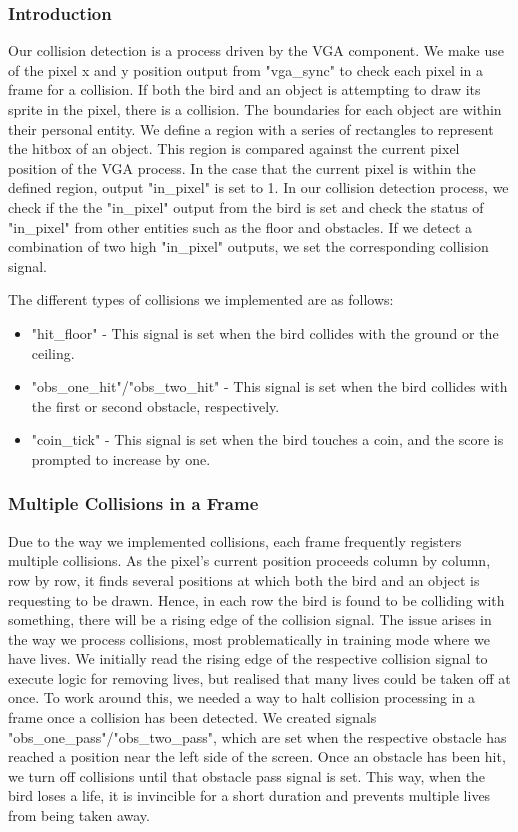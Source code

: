\documentclass[conference]{IEEEtran}
\begin{document}
\subsubsection{Introduction}
Our collision detection is a process driven by the VGA component. We make use of the pixel x and y position output from "vga\_sync" to check each pixel in a frame for a collision. If both the bird and an object is attempting to draw its sprite in the pixel, there is a collision. The boundaries for each object are within their personal entity. We define a region with a series of rectangles to represent the hitbox of an object. This region is compared against the current pixel position of the VGA process. In the case that the current pixel is within the defined region, output "in\_pixel" is set to 1. In our collision detection process, we check if the the "in\_pixel" output from the bird is set and check the status of "in\_pixel" from other entities such as the floor and obstacles. If we detect a combination of two high "in\_pixel" outputs, we set the corresponding collision signal.

The different types of collisions we implemented are as follows:
\begin{itemize}
    \item "hit\_floor" - This signal is set when the bird collides with the ground or the ceiling.
    \item "obs\_one\_hit"/"obs\_two\_hit" - This signal is set when the bird collides with the first or second obstacle, respectively.
    \item "coin\_tick" - This signal is set when the bird touches a coin, and the score is prompted to increase by one.
\end{itemize}

\subsubsection{Multiple Collisions in a Frame}
Due to the way we implemented collisions, each frame frequently registers multiple collisions. As the pixel's current position proceeds column by column, row by row, it finds several positions at which both the bird and an object is requesting to be drawn. Hence, in each row the bird is found to be colliding with something, there will be a rising edge of the collision signal. The issue arises in the way we process collisions, most problematically in training mode where we have lives. We initially read the rising edge of the respective collision signal to execute logic for removing lives, but realised that many lives could be taken off at once. To work around this, we needed a way to halt collision processing in a frame once a collision has been detected. We created signals "obs\_one\_pass"/"obs\_two\_pass", which are set when the respective obstacle has reached a position near the left side of the screen. Once an obstacle has been hit, we turn off collisions until that obstacle pass signal is set. This way, when the bird loses a life, it is invincible for a short duration and prevents multiple lives from being taken away.
\end{document}
